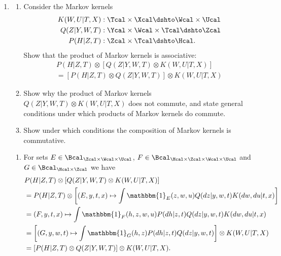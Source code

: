 \begin{enumerate}
  \item %
  \begin{enumerate}
    \item
    Consider the Markov kernels
    \begin{align*}
      K(W, U | T, X) & : \Tcal\times \Xcal \dshto \Wcal \times \Ucal  \\
      Q(Z | Y, W, T) & : \Ycal \times \Wcal \times \Tcal \dshto \Zcal \\
      P(H|Z, T)      & : \Zcal \times \Tcal \dshto \Hcal.
    \end{align*}
    Show that the product of Markov kernels is associative:
    \begin{multline*}
      P(H|Z, T) \otimes \left[ Q(Z | Y, W, T) \otimes K(W, U|T, X) \right]\\
      = \left[P(H|Z, T) \otimes  Q(Z | Y, W, T) \right] \otimes K(W, U|T, X)
    \end{multline*}
    \item
    Show why the product of Markov kernels $Q(Z | Y, W, T) \otimes K(W, U|T, X)$ does not commute, and state general conditions under which products of Markov kernels do commute.
    \item Show under which conditions the composition of Markov kernels is commutative.
  \end{enumerate}
  \begin{ungradedsolution}
    \begin{enumerate}
      \item For sets $E\in\Bcal_{\Zcal\times\Wcal \times\Ucal}$, $F\in\Bcal_{\Hcal\times\Zcal\times \Wcal \times \Ucal}$ and $G\in\Bcal_{\Hcal\times\Zcal}$ we have
      \begin{align*}
         & P(H|Z, T) \otimes \left[ Q(Z | Y, W, T) \otimes K(W, U|T, X) \right]                                              \\
         & = P(H|Z, T) \otimes \left[(E, y, t, x) \mapsto \int \mathbbm{1}_{E}(z, w, u)Q(dz | y,w, t)K(dw, du| t, x) \right] \\
         & = (F, y, t, x) \mapsto \int \mathbbm{1}_{F}(h, z, w, u)P(dh|z, t)Q(dz | y,w, t)K(dw, du| t, x)                    \\
         & = \left[(G, y, w, t) \mapsto \int \mathbbm{1}_{G}(h, z)P(dh|z, t)Q(dz | y,w, t) \right] \otimes K(W, U|T, X)      \\
         & = \left[P(H|Z, T) \otimes Q(Z | Y, W, T) \right] \otimes K(W, U|T, X).
      \end{align*}

\end{enumerate}
\end{ungradedsolution}
\end{enumerate}
